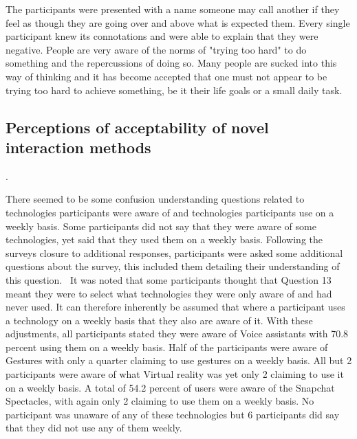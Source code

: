 \documentclass{l4proj}
\begin{document}
The participants were presented with a name someone may call another if they feel as though they are going over and above what is expected them. Every single participant knew its connotations and were able to explain that they were negative. People are very aware of the norms of "trying too hard" to do something and the repercussions of doing so. Many people are sucked into this way of thinking and it has become accepted that one must not appear to be trying too hard to achieve something, be it their life goals or a small daily task.

\subsection{Perceptions of acceptability of novel interaction methods}.

There seemed to be some confusion understanding questions related to technologies participants were aware of and technologies participants use on a weekly basis. Some participants did not say that they were aware of some technologies, yet said that they used them on a weekly basis. Following the surveys closure to additional responses, participants were asked some additional questions about the survey, this included them detailing their understanding of this question.  It was noted that some participants thought that Question 13 meant they were to select what technologies they were only aware of and had never used. It can therefore inherently be assumed that where a participant uses a technology on a weekly basis that they also are aware of it. With these adjustments, all participants stated they were aware of Voice assistants with 70.8 percent using them on a weekly basis. Half of the participants were aware of Gestures with only a quarter claiming to use gestures on a weekly basis. All but 2 participants were aware of what Virtual reality was yet only 2 claiming to use it on a weekly basis. A total of 54.2 percent of users were aware of the Snapchat Spectacles, with again only 2 claiming to use them on a weekly basis. No participant was unaware of any of these technologies but 6 participants did say that they did not use any of them weekly.
\end{document}
